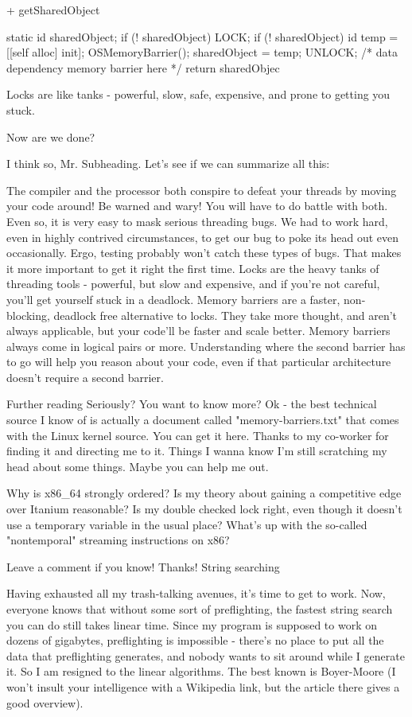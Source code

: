 {{{{{+ getSharedObject {
    static id sharedObject;
    if (! sharedObject) {
        LOCK;
        if (! sharedObject) {
            id temp = [[self alloc] init];
            OSMemoryBarrier();
            sharedObject = temp;
        }
        UNLOCK;
    }
    /* data dependency memory barrier here */
    return sharedObjec

Locks are like tanks - powerful, slow, safe, expensive, and prone to getting you stuck. 

Now are we done?

I think so, Mr. Subheading. Let's see if we can summarize all this: 

    The compiler and the processor both conspire to defeat your threads by moving your code around! Be warned and wary! You will have to do battle with both.
    Even so, it is very easy to mask serious threading bugs. We had to work hard, even in highly contrived circumstances, to get our bug to poke its head out even occasionally.
    Ergo, testing probably won't catch these types of bugs. That makes it more important to get it right the first time.
    Locks are the heavy tanks of threading tools - powerful, but slow and expensive, and if you're not careful, you'll get yourself stuck in a deadlock.
    Memory barriers are a faster, non-blocking, deadlock free alternative to locks. They take more thought, and aren't always applicable, but your code'll be faster and scale better.
    Memory barriers always come in logical pairs or more. Understanding where the second barrier has to go will help you reason about your code, even if that particular architecture doesn't require a second barrier.

Further reading
Seriously? You want to know more? Ok - the best technical source I know of is actually a document called "memory-barriers.txt" that comes with the Linux kernel source. You can get it here. Thanks to my co-worker for finding it and directing me to it. 
Things I wanna know
I'm still scratching my head about some things. Maybe you can help me out.

    Why is x86_64 strongly ordered? Is my theory about gaining a competitive edge over Itanium reasonable?
    Is my double checked lock right, even though it doesn't use a temporary variable in the usual place?
    What's up with the so-called "nontemporal" streaming instructions on x86?

Leave a comment if you know! Thanks! 
String searching

Having exhausted all my trash-talking avenues, it's time to get to work. Now, everyone knows that without some sort of preflighting, the fastest string search you can do still takes linear time. Since my program is supposed to work on dozens of gigabytes, preflighting is impossible - there's no place to put all the data that preflighting generates, and nobody wants to sit around while I generate it. So I am resigned to the linear algorithms. The best known is Boyer-Moore (I won't insult your intelligence with a Wikipedia link, but the article there gives a good overview).

}}}}}}
